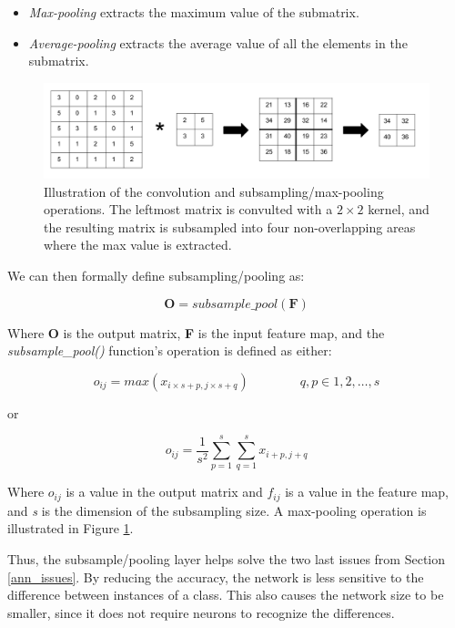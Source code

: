 \begin{itemize}
	\item \textit{Max-pooling} extracts the maximum value of the submatrix.
	\item \textit{Average-pooling} extracts the average value of all the elements in the submatrix.
\end{itemize}

\begin{figure}[h!]
  \centering
      \includegraphics[width=1.0\textwidth]{Figures/Background/Convolution-Maxpooling}
  \caption[Convolution and subsampling/max-pooling operation]{Illustration of the convolution and subsampling/max-pooling operations. The leftmost matrix is convulted with a $ 2 \times 2 $ kernel, and the resulting matrix is subsampled into four non-overlapping areas where the max value is extracted.}
  \label{fig_conv_ss_mp}
\end{figure}

We can then formally define subsampling/pooling as:

\begin{equation}
	\mathbf{O} = subsample\_pool(\mathbf{F})
\end{equation}


Where \textbf{O} is the output matrix, \textbf{F} is the input feature map, and the \textit{subsample\_pool()} function's operation is defined as either:

\begin{equation}
o_{ij} = max(x_{i \times s+p, j \times s+q}) \qquad\qquad q,p \in 1, 2, \dots, s
\end{equation}

or

\begin{equation}
o_{ij} = \frac{1}{s^2} \sum_{p=1}^{s}\sum_{q=1}^{s} x_{i+p, j+q}
\end{equation}

Where $ o_{ij} $ is a value in the output matrix and $ f_{ij} $ is a value in the feature map, and \textit{s} is the dimension of the subsampling size. A max-pooling operation is illustrated in Figure \ref{fig_conv_ss_mp}.

Thus, the subsample/pooling layer helps solve the two last issues from Section \ref{ann_issues}. By reducing the accuracy, the network is less sensitive to the difference between instances of a class. This also causes the network size to be smaller, since it does not require neurons to recognize the differences. 


